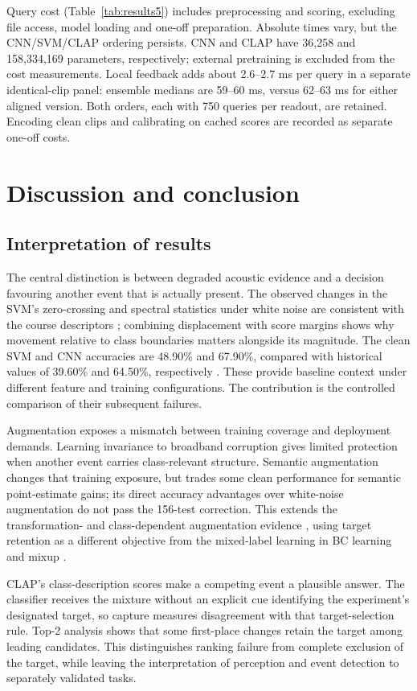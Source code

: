 \documentclass[a4paper,10pt]{article}
\begin{document}
Query cost (Table~\ref{tab:results5}) includes preprocessing and scoring, excluding file access, model loading and one-off preparation. Absolute times vary, but the CNN/SVM/CLAP ordering persists. CNN and CLAP have 36,258 and 158,334,169 parameters, respectively; external pretraining is excluded from the cost measurements. Local feedback adds about 2.6--2.7 ms per query in a separate identical-clip panel: ensemble medians are 59--60 ms, versus 62--63 ms for either aligned version. Both orders, each with 750 queries per readout, are retained. Encoding clean clips and calibrating on cached scores are recorded as separate one-off costs.

\section{Discussion and conclusion}

\subsection{Interpretation of results}

The central distinction is between degraded acoustic evidence and a decision favouring another event that is actually present. The observed changes in the SVM's zero-crossing and spectral statistics under white noise are consistent with the course descriptors \cite{course3}; combining displacement with score margins shows why movement relative to class boundaries matters alongside its magnitude. The clean SVM and CNN accuracies are 48.90\% and 67.90\%, compared with historical values of 39.60\% and 64.50\%, respectively \cite{piczak,esc}. These provide baseline context under different feature and training configurations. The contribution is the controlled comparison of their subsequent failures.

Augmentation exposes a mismatch between training coverage and deployment demands. Learning invariance to broadband corruption gives limited protection when another event carries class-relevant structure. Semantic augmentation changes that training exposure, but trades some clean performance for semantic point-estimate gains; its direct accuracy advantages over white-noise augmentation do not pass the 156-test correction. This extends the transformation- and class-dependent augmentation evidence \cite{augmentation}, using target retention as a different objective from the mixed-label learning in BC learning and mixup \cite{bc,mixup}.

CLAP's class-description scores \cite{clap} make a competing event a plausible answer. The classifier receives the mixture without an explicit cue identifying the experiment's designated target, so capture measures disagreement with that target-selection rule. Top-2 analysis shows that some first-place changes retain the target among leading candidates. This distinguishes ranking failure from complete exclusion of the target, while leaving the interpretation of perception and event detection to separately validated tasks.
\end{document}
